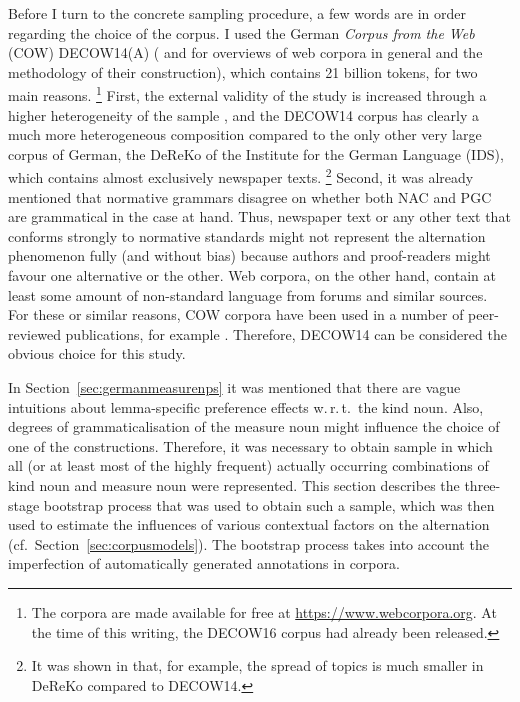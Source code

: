 \documentclass[USenglish]{article}
\begin{document}
Before I turn to the concrete sampling procedure, a few words are in order regarding the choice of the corpus.
I used the German \textit{Corpus from the Web} (COW) DECOW14(A) (\citealp{SchaeferBildhauer2012full,Schaefer2015b} and \citealp{BiemannEa2013,SchaeferBildhauer2013} for overviews of web corpora in general and the methodology of their construction), which contains 21 billion tokens, for two main reasons.%
\footnote{The corpora are made available for free at \url{https://www.webcorpora.org}.
At the time of this writing, the DECOW16 corpus had already been released.}
First, the external validity of the study is increased through a higher heterogeneity of the sample \citep[30]{MaxwellDelaney2004}, and the DECOW14 corpus has clearly a much more heterogeneous composition compared to the only other very large corpus of German, the DeReKo \citep{KupietzEa2010} of the Institute for the German Language (IDS), which contains almost exclusively newspaper texts.%
\footnote{It was shown in \cite{W16-2601} that, for example, the spread of topics is much smaller in DeReKo compared to DECOW14.}
Second, it was already mentioned that normative grammars disagree on whether both NAC and PGC are grammatical in the case at hand.
Thus, newspaper text or any other text that conforms strongly to normative standards might not represent the alternation phenomenon fully (and without bias) because authors and proof-readers might favour one alternative or the other.
Web corpora, on the other hand, contain at least some amount of non-standard language from forums and similar sources.
For these or similar reasons, COW corpora have been used in a number of peer-reviewed publications, for example \cite{VanGoethemHiligsmann2014,VanGoethemHuening2015,MuellerS2014,Schaefer2016c,SchaeferSayatz2014,SchaeferSayatz2016,StefanowitschFlach2016,Zimmer2015}. 
Therefore, DECOW14 can be considered the obvious choice for this study.

In Section~\ref{sec:germanmeasurenps} it was mentioned that there are vague intuitions about lemma-specific preference effects w.\,r.\,t.\ the kind noun.
Also, degrees of grammaticalisation of the measure noun might influence the choice of one of the constructions.
Therefore, it was necessary to obtain sample in which all (or at least most of the highly frequent) actually occurring combinations of kind noun and measure noun were represented.
This section describes the three-stage bootstrap process that was used to obtain such a sample, which was then used to estimate the influences of various contextual factors on the alternation (cf.\ Section~\ref{sec:corpusmodels}).
The bootstrap process takes into account the imperfection of automatically generated annotations in corpora.
\end{document}
